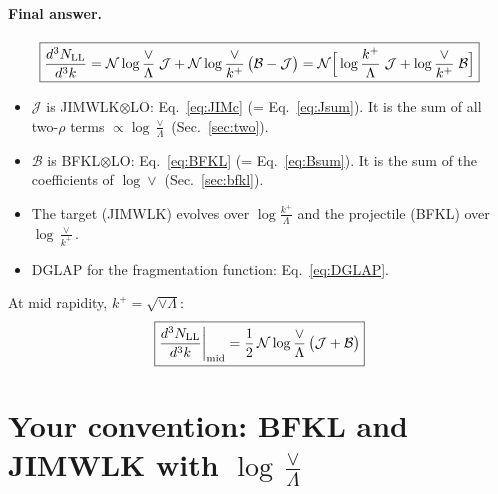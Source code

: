 \documentclass[10pt]{article}
\numberwithin{equation}{section}
\newcommand{\NN}{\mathcal N\log\frac{\vee}{\Lambda}}
\begin{document}
\paragraph{Final answer.}
\begin{equation}
\boxed{\frac{d^3N_{\rm LL}}{d^3k}=\NN\;\mathcal J+\mathcal N\log\frac{\vee}{k^+}\,\big(\mathcal B-\mathcal J\big)=\mathcal N\Big[\log\frac{k^+}{\Lambda}\;\mathcal J+\log\frac{\vee}{k^+}\;\mathcal B\Big]}
\label{eq:final}
\end{equation}
\begin{itemize}
\item $\mathcal J$ is JIMWLK$\otimes$LO: Eq.~\eqref{eq:JIMc} (= Eq.~\eqref{eq:Jsum}). It is the sum of all two-$\rho$ terms $\propto\log\frac{\vee}{\Lambda}$ (Sec.~\ref{sec:two}).
\item $\mathcal B$ is BFKL$\otimes$LO: Eq.~\eqref{eq:BFKL} (= Eq.~\eqref{eq:Bsum}). It is the sum of the coefficients of $\log\vee$ (Sec.~\ref{sec:bfkl}).
\item The target (JIMWLK) evolves over $\log\frac{k^+}{\Lambda}$ and the projectile (BFKL) over $\log\frac{\vee}{k^+}$.
\item DGLAP for the fragmentation function: Eq.~\eqref{eq:DGLAP}.
\end{itemize}
At mid rapidity, $k^+=\sqrt{\vee\Lambda}$:
\begin{equation}
\boxed{\frac{d^3N_{\rm LL}}{d^3k}\bigg|_{\rm mid}=\frac12\,\NN\,\big(\mathcal J+\mathcal B\big)}
\label{eq:finalmid}
\end{equation}

\section{Your convention: BFKL and JIMWLK with $\log\frac{\vee}{\Lambda}$}\label{sec:why}
\end{document}
